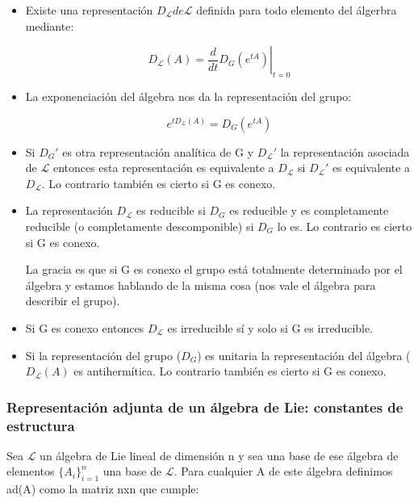 \documentclass{article}
\begin{document}
         \begin{itemize}
             \item Existe una representación $D_\mathcal{L} de \mathcal{L}$ definida para todo elemento del álgerbra mediante:

             $$D_\mathcal{L}(A)=\left .\frac{d}{dt}D_G(e^{tA})\right |_{t=0}$$

             \item La exponenciación del álgebra nos da la representación del grupo:

             $$e^{tD_\mathcal{L}(A)}=D_G(e^{tA})$$

             \item Si $D_G'$ es otra representación analítica de G y $D_\mathcal{L}'$ la representación asociada de $\mathcal{L}$ entonces esta representación es equivalente a $D_\mathcal{L}$ si $D_\mathcal{L}'$ es equivalente a $D_\mathcal{L}$. Lo contrario también es cierto si G es conexo.

             \item La representación $D_\mathcal{L}$ es reducible si $D_G$ es reducible y es completamente reducible (o completamente descomponible) si $D_G$ lo es. Lo contrario es cierto si G es conexo.

             La gracia es que si G es conexo el grupo está totalmente determinado por el álgebra y estamos hablando de la misma cosa (nos vale el álgebra para describir el grupo).

             \item Si G es conexo entonces $D_\mathcal{L}$ es irreducible sí y solo si G es irreducible.

             \item Si la representación del grupo ($D_G$) es unitaria la representación del álgebra ($D_\mathcal{L}(A)$ es antihermítica. Lo contrario también es cierto si G es conexo.
         \end{itemize}



      \subsubsection{Representación adjunta de un álgebra de Lie: constantes de estructura}

      Sea $\mathcal{L}$ un álgebra de Lie lineal de dimensión n y sea una base de ese álgebra de elementos $\lbrace A_i\rbrace _{i=1}^n$ una base de $\mathcal{L}$. Para cualquier A de este álgebra definimos ad(A) como la matriz nxn que cumple:
\end{document}
